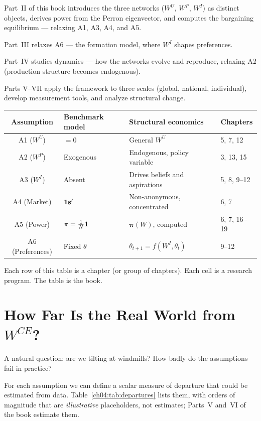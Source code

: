 \documentclass[../structural_economics_book.tex]{subfiles}
\begin{document}
Part~II of this book introduces the three networks ($W^U$, $W^P$, $W^I$) as distinct objects, derives power from the Perron eigenvector, and computes the bargaining equilibrium --- relaxing A1, A3, A4, and A5.

Part~III relaxes A6 --- the formation model, where $W^I$ shapes preferences.

Part~IV studies dynamics --- how the networks evolve and reproduce, relaxing A2 (production structure becomes endogenous).

Parts V--VII apply the framework to three scales (global, national, individual), develop measurement tools, and analyze structural change.

\begin{center}
\small
\begin{tabular}{clll}
\toprule
\textbf{Assumption} & \textbf{Benchmark model} & \textbf{Structural economics} & \textbf{Chapters} \\
\midrule
A1 ($W^U$) & $= 0$ & General $W^U$ & 5, 7, 12 \\
A2 ($W^P$) & Exogenous & Endogenous, policy variable & 3, 13, 15 \\
A3 ($W^I$) & Absent & Drives beliefs and aspirations & 5, 8, 9--12 \\
A4 (Market) & $\mathbf{1}\mathbf{s}'$ & Non-anonymous, concentrated & 6, 7 \\
A5 (Power) & $\pi = \frac{1}{N}\mathbf{1}$ & $\boldsymbol{\pi}(W)$, computed & 6, 7, 16--19 \\
A6 (Preferences) & Fixed $\theta$ & $\theta_{t+1} = f(W^I, \theta_t)$ & 9--12 \\
\bottomrule
\end{tabular}
\end{center}

Each row of this table is a chapter (or group of chapters). Each cell is a research program. The table is the book.


\section{How Far Is the Real World from $W^{CE}$?}
\label{ch04:sec:how_far}

A natural question: are we tilting at windmills? How badly do the assumptions fail in practice?

For each assumption we can define a scalar measure of departure that could be estimated from data. Table~\ref{ch04:tab:departures} lists them, with orders of magnitude that are \textit{illustrative} placeholders, not estimates; Parts~V and~VI of the book estimate them.
\end{document}

